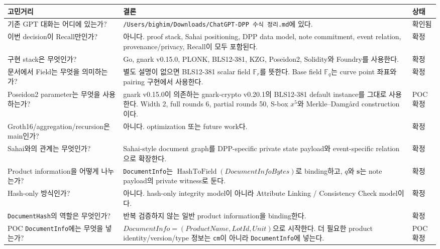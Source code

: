\documentclass[11pt]{extarticle}
\newcounter{none} %
\DeclareMathOperator{\HashToField}{HashToField}
\begin{document}
{\def\LTcaptype{none} %
\small
\renewcommand{\arraystretch}{1.3}
\setlength{\tabcolsep}{5pt}
\begin{longtable}[]{@{}L{0.24\textwidth}L{0.56\textwidth}L{0.12\textwidth}@{}}
\toprule\noalign{}
\textbf{고민거리} & \textbf{결론} & \textbf{상태} \\
\midrule\noalign{}
\endhead
\bottomrule\noalign{}
\endlastfoot
기존 GPT 대화는 어디에 있는가? &
\texttt{/Users/bighim/Downloads/ChatGPT-DPP\ 수식\ 정리.md}에 있다. &
확인됨 \\
이번 decision이 Recall만인가? & 아니다. proof stack, Sahai positioning,
DPP data model, note commitment, event relation, provenance/privacy,
Recall이 모두 포함된다. & 확정 \\
구현 stack은 무엇인가? & Go, gnark v0.15.0, PLONK, BLS12-381, KZG,
Poseidon2, Solidity와 Foundry를 사용한다. & 확정 \\
문서에서 Field는 무엇을 의미하는가? & 별도 설명이 없으면 BLS12-381 scalar field
$\mathbb{F}_r$를 뜻한다. Base field $\mathbb{F}_q$는 curve point 좌표와 pairing
구현에서 사용한다. & 확정 \\
Poseidon2 parameter는 무엇을 사용하는가? & gnark v0.15.0이 의존하는
gnark-crypto v0.20.1의 BLS12-381 default instance를 그대로 사용한다.
Width 2, full rounds 6, partial rounds 50, S-box $x^5$와
Merkle--Damg\aa rd construction이다. & POC 확정 \\
Groth16/aggregation/recursion은 main인가? & 아니다. optimization 또는
future work다. & 확정 \\
Sahai와의 관계는 무엇인가? & Sahai-style document graph를 DPP-specific
private state payload와 event-specific relation으로 확장한다. & 확정 \\
Product information을 어떻게 나누는가? & \texttt{DocumentInfo}는
$\HashToField(\mathit{DocumentInfoBytes})$로 binding하고,
$q$와 $\mathbf{s}$는 note payload의 private witness로 둔다. & 확정 \\
Hash-only 방식인가? & 아니다. hash-only integrity model이 아니라
Attribute Linking / Consistency Check model이다. & 확정 \\
\texttt{DocumentHash}의 역할은 무엇인가? & 반복 검증하지 않는 일반
product information을 binding한다. & 확정 \\
POC \texttt{DocumentInfo}에는 무엇을 넣는가? &
\(\mathit{DocumentInfo}=(\mathit{ProductName},\mathit{LotId},\mathit{Unit})\)으로 시작한다.
더 필요한 product identity/version/type 정보는 \texttt{cm}이 아니라
\texttt{DocumentInfo}에 넣는다. & POC 확정 \\

\end{longtable}}
\end{document}
